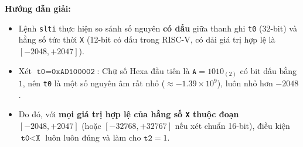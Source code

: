 \textbf{Hướng dẫn giải:}
\begin{itemize}
    \item Lệnh \texttt{slti} thực hiện so sánh số nguyên \textbf{có dấu} giữa thanh ghi \texttt{t0} (32-bit) và hằng số tức thời \texttt{X} (12-bit có dấu trong RISC-V, có dải giá trị hợp lệ là $[-2048, +2047]$).
    \item Xét $\texttt{t0} = \texttt{0xAD100002}$: Chữ số Hexa đầu tiên là $\texttt{A} = 1010_{(2)}$ có bit dấu bằng $1$, nên \texttt{t0} là một số nguyên âm rất nhỏ ($\approx -1.39 \times 10^9$), luôn nhỏ hơn $-2048$.
    \item Do đó, với \textbf{mọi giá trị hợp lệ của hằng số \texttt{X} thuộc đoạn $[-2048, +2047]$} (hoặc $[-32768, +32767]$ nếu xét chuẩn 16-bit), điều kiện $\texttt{t0} < \texttt{X}$ luôn luôn đúng và làm cho $\texttt{t2} = 1$.
\end{itemize}

